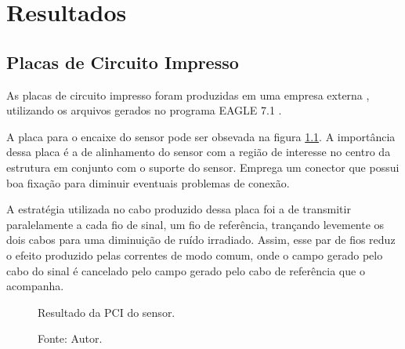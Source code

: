 \chapter{Resultados}

\section{Placas de Circuito Impresso}

As placas de circuito impresso foram produzidas em uma empresa externa \cite{euroC}, utilizando os arquivos gerados no programa EAGLE 7.1 \cite{EagleWiki}. 

A placa para o encaixe do sensor pode ser obsevada na figura \ref{fig:pcbSensor}. A importância dessa placa é a de alinhamento do sensor com a região de interesse no centro da estrutura em conjunto com o suporte do sensor. Emprega um conector que possui boa fixação para diminuir eventuais problemas de conexão. 

A estratégia utilizada no cabo produzido dessa placa foi a de transmitir paralelamente a cada fio de sinal, um fio de referência, trançando levemente os dois cabos para uma diminuição de ruído irradiado. Assim, esse par de fios reduz o efeito produzido pelas correntes de modo comum, onde o campo gerado pelo cabo do sinal é cancelado pelo campo gerado pelo cabo de referência que o acompanha.

\begin{figure}[H]
    \centering
     \caption{Resultado da PCI do sensor.}
     \caption*{Fonte: Autor.}\label{fig:pcbSensor}
\end{figure}

